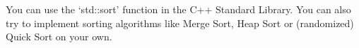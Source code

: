 You can use the `std::sort' function in the C++ Standard Library.
You can also try to implement sorting algorithms like Merge Sort, Heap Sort or (randomized) Quick Sort on your own.